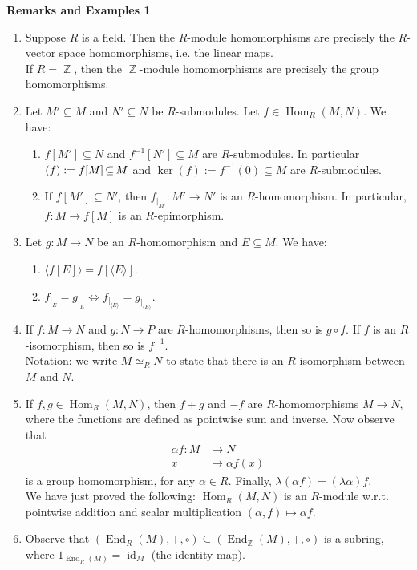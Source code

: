 \documentclass[12pt,a4paper]{report}
\theoremstyle{definition}
\newtheorem*{remex}{Remarks and Examples}
\theoremstyle{num.custom-title}
\DeclareMathOperator{\id}{id}
\let\o\relax %
\DeclareMathOperator{\o}{\mathsf{o}}
\let\Im\relax %
\DeclareMathOperator{\Im}{Im}
\DeclareMathOperator{\Hom}{Hom}
\DeclareMathOperator{\End}{End}
\DeclareMathOperator{\Z}{\mathbb{Z}}
\DeclareMathOperator{\sse}{\subseteq}
\renewcommand{\iff}{\Leftrightarrow}
\begin{document}
\begin{remex}\ 
\begin{enumerate}
\item Suppose $R$ is a field. Then the $R$-module homomorphisms are precisely the $R$-vector space homomorphisms, i.e. the linear maps.\\
If $R=\Z$, then the $\Z$-module homomorphisms are precisely the group homomorphisms.\label{Z-hom=goup_hom}
\item Let $M' \sse M$ and $N' \sse N$ be $R$-submodules. Let $f \in \Hom_R(M,N)$. We have:
\begin{enumerate}
\item $f[M'] \sse N$ and $f^{-1}[N'] \sse M$ are $R$-submodules. In particular $\Im(f) := f[M] \sse M$ and $\ker(f) := f^{-1}(0) \sse M$ are $R$-submodules.
\item If $f[M'] \sse N'$, then $f_{|_{M'}} : M' \to N'$ is an $R$-homomorphism. In particular, $f : M \to f[M]$ is an $R$-epimorphism.
\end{enumerate}
\item Let $g : M \to N$ be an $R$-homomorphism and $E \sse M$. We have:
\begin{enumerate}
\item $\langle f[E] \rangle = f[ \langle E \rangle ]$.
\item $f_{|_E} = g_{|_E} \iff f_{|_{\langle E \rangle}} = g_{|_{\langle E \rangle}}$.
\end{enumerate}
\item If $f: M \to N$ and $g: N \to P$ are $R$-homomorphisms, then so is $g \circ f$. If $f$ is an $R$-isomorphism, then so is $f^{-1}$.\\
Notation: we write $M \simeq_R N$ to state that there is an $R$-isomorphism between $M$ and $N$.
\item If $f,g \in \Hom_R(M,N)$, then $f+g$ and $-f$ are $R$-homomorphisms $M \to N$, where the functions are defined as pointwise sum and inverse. Now observe that
\begin{align*}
\alpha f \colon M &\to N \\
x &\mapsto \alpha f(x)
\end{align*}
is a group homomorphism, for any $\alpha \in R$. Finally, $\lambda (\alpha f) = (\lambda \alpha) f$.\\
We have just proved the following: $\Hom_R(M,N)$ is an $R$-module w.r.t. pointwise addition and scalar multiplication $(\alpha,f) \mapsto \alpha f$.
\item Observe that $(\End_R(M),+,\circ) \sse (\End_{\Z}(M),+,\circ)$ is a subring, where $1_{\End_R(M)} = \id_M$ (the identity map).
\end{enumerate}
\end{remex}
\end{document}
